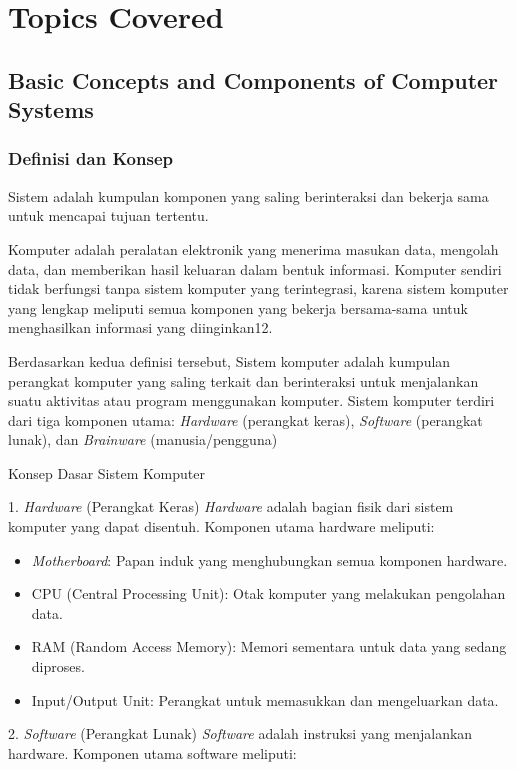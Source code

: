 \documentclass[12pt]{article}
\begin{document}
\section{Topics Covered}

\subsection{Basic Concepts and Components of Computer Systems}
    \subsubsection{Definisi dan Konsep}
    \hspace*{1cm}Sistem adalah kumpulan komponen yang saling berinteraksi dan bekerja sama untuk mencapai tujuan tertentu.
    
    Komputer adalah peralatan elektronik yang menerima masukan data, mengolah data, dan memberikan hasil keluaran dalam bentuk informasi. Komputer sendiri tidak berfungsi tanpa sistem komputer yang terintegrasi, karena sistem komputer yang lengkap meliputi semua komponen yang bekerja bersama-sama untuk menghasilkan informasi yang diinginkan12.
    
    Berdasarkan kedua definisi tersebut, Sistem komputer adalah kumpulan perangkat komputer yang saling terkait dan berinteraksi untuk menjalankan suatu aktivitas atau program menggunakan komputer. Sistem komputer terdiri dari tiga komponen utama: \textit {Hardware} (perangkat keras), \textit{Software} (perangkat lunak), dan \textit{Brainware} (manusia/pengguna)
    
Konsep Dasar Sistem Komputer

1. \textit {Hardware} (Perangkat Keras)
\textit {Hardware} adalah bagian fisik dari sistem komputer yang dapat disentuh. Komponen utama hardware meliputi:
\begin{itemize}
    \item \textit{Motherboard}: Papan induk yang menghubungkan semua komponen hardware.
    \item CPU (Central Processing Unit): Otak komputer yang melakukan pengolahan data.
    \item RAM (Random Access Memory): Memori sementara untuk data yang sedang diproses.
    \item Input/Output Unit: Perangkat untuk memasukkan dan mengeluarkan data.
\end{itemize}

2. \textit{Software} (Perangkat Lunak)
\textit{Software} adalah instruksi yang menjalankan hardware. Komponen utama software meliputi:
\end{document}
